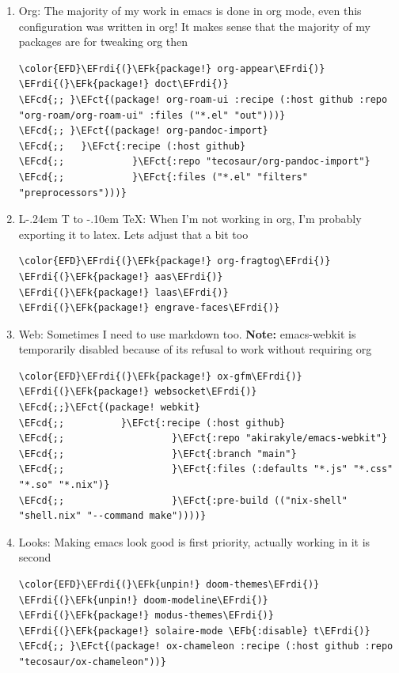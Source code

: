 \documentclass{scrartcl}
\makeatletter
\DeclareRobustCommand{\LaTeX}{L\kern-.24em%
        {\sbox\z@ T%
         \vbox to\ht\z@{\hbox{\check@mathfonts
                              \fontsize\sf@size\z@
                              \math@fontsfalse\selectfont
                              A}%
                        \vss}%
        }%
        \kern-.10em%
        \TeX}
\newcommand{\EFk}[1]{\textcolor{EFk}{#1}} %
\newcommand{\EFb}[1]{\textcolor{EFb}{#1}} %
\newcommand{\EFct}[1]{\textcolor{EFct}{#1}} %
\newcommand{\EFcd}[1]{\textcolor{EFcd}{#1}} %
\newcommand{\EFrdi}[1]{#1} %
\makeatother
\begin{document}
\begin{enumerate}
\item Org:
\label{sec:orgcef2d95}
The majority of my work in emacs is done in org mode, even this configuration
was written in org! It makes sense that the majority of my packages are for
tweaking org then
\begin{Code}
\begin{Verbatim}[]
\color{EFD}\EFrdi{(}\EFk{package!} org-appear\EFrdi{)}
\EFrdi{(}\EFk{package!} doct\EFrdi{)}
\EFcd{;; }\EFct{(package! org-roam-ui :recipe (:host github :repo "org-roam/org-roam-ui" :files ("*.el" "out")))}
\EFcd{;; }\EFct{(package! org-pandoc-import}
\EFcd{;;   }\EFct{:recipe (:host github}
\EFcd{;;            }\EFct{:repo "tecosaur/org-pandoc-import"}
\EFcd{;;            }\EFct{:files ("*.el" "filters" "preprocessors")))}
\end{Verbatim}
\end{Code}

\item \LaTeX:
\label{sec:org88e5229}
When I'm not working in org, I'm probably exporting it to latex. Lets adjust
that a bit too
\begin{Code}
\begin{Verbatim}[]
\color{EFD}\EFrdi{(}\EFk{package!} org-fragtog\EFrdi{)}
\EFrdi{(}\EFk{package!} aas\EFrdi{)}
\EFrdi{(}\EFk{package!} laas\EFrdi{)}
\EFrdi{(}\EFk{package!} engrave-faces\EFrdi{)}
\end{Verbatim}
\end{Code}

\item Web:
\label{sec:orgb0a67ab}
Sometimes I need to use markdown too. \textbf{Note:} emacs-webkit is temporarily disabled
because of its refusal to work without requiring org
\begin{Code}
\begin{Verbatim}[]
\color{EFD}\EFrdi{(}\EFk{package!} ox-gfm\EFrdi{)}
\EFrdi{(}\EFk{package!} websocket\EFrdi{)}
\EFcd{;;}\EFct{(package! webkit}
\EFcd{;;          }\EFct{:recipe (:host github}
\EFcd{;;                   }\EFct{:repo "akirakyle/emacs-webkit"}
\EFcd{;;                   }\EFct{:branch "main"}
\EFcd{;;                   }\EFct{:files (:defaults "*.js" "*.css" "*.so" "*.nix")}
\EFcd{;;                   }\EFct{:pre-build (("nix-shell" "shell.nix" "--command make"))))}
\end{Verbatim}
\end{Code}

\item Looks:
\label{sec:org42cb8e3}
Making emacs look good is first priority, actually working in it is second
\begin{Code}
\begin{Verbatim}[]
\color{EFD}\EFrdi{(}\EFk{unpin!} doom-themes\EFrdi{)}
\EFrdi{(}\EFk{unpin!} doom-modeline\EFrdi{)}
\EFrdi{(}\EFk{package!} modus-themes\EFrdi{)}
\EFrdi{(}\EFk{package!} solaire-mode \EFb{:disable} t\EFrdi{)}
\EFcd{;; }\EFct{(package! ox-chameleon :recipe (:host github :repo "tecosaur/ox-chameleon"))}
\end{Verbatim}
\end{Code}


\end{enumerate}
\end{document}
